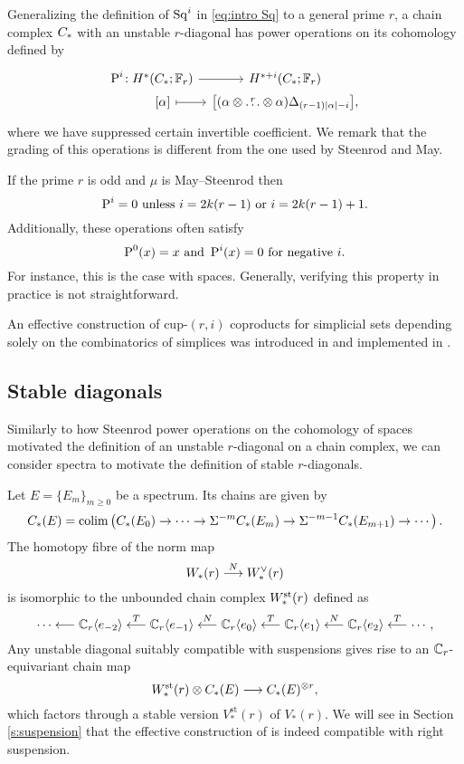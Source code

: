 Generalizing the definition of $\operatorname{Sq}^i$ in \cref{eq:intro Sq} to a general prime $r$, a chain complex $C_{*}$ with an unstable $r$-diagonal has power operations on its cohomology defined by
\begin{equation}\label{eq:intro P}
	\begin{tikzcd}[column sep=tiny, row sep=0]
		\power^i \colon &[-15pt] H^*(\ucadenas;\bF_r) \arrow[r] & H^{*+i}(\ucadenas;\bF_r) \\
		& {[\alpha]} \arrow[r, mapsto] & \big{[}(\alpha \ot \overset{r}{\dots} \ot \alpha)\Delta_{(r-1)\bars{\alpha}-i}\big{]},
	\end{tikzcd}
\end{equation}
where we have suppressed certain invertible coefficient.
We remark that the grading of this operations is different from the one used by Steenrod and May.

If the prime $r$ is odd and $\mu$ is May--Steenrod then
\[
\operatorname{P}^i = 0 \text{ unless } i = 2k(r-1) \text{ or }i = 2k(r-1)+1.
\]
Additionally, these operations often satisfy
\[
\operatorname{P}^0(x) = x \text{ and }\operatorname{P}^i(x) = 0 \text{ for negative } i.
\]
For instance, this is the case with spaces.
Generally, verifying this property in practice is not straightforward.

An effective construction of cup-$(r,i)$ coproducts for simplicial sets depending solely on the combinatorics of simplices was introduced in \cite{medina2021may_st} and implemented in \cite{medina2021comch}.

\subsection{Stable diagonals}

Similarly to how Steenrod power operations on the cohomology of spaces motivated the definition of an unstable $r$-diagonal on a chain complex, we can consider spectra to motivate the definition of stable $r$-diagonals.

Let $E = \{E_m\}_{m \geq 0}$ be a spectrum. Its chains are given by
\[
C_{*}(E) = \operatorname*{colim} \left(C_{*}(E_0) \to \dots \to \Sigma^{-m}C_{*}(E_m) \to \Sigma^{-m-1} C_{*}(E_{m+1}) \to \dotsb\right).
\]
The homotopy fibre of the norm map
\[
W_{*}(r) \overset{N}{\longrightarrow} W^\vee_{*}(r)
\]
is isomorphic to the unbounded chain complex $W^{\mathrm{st}}_{*}(r)$ defined as
\[
\dotsb \longleftarrow \mathbb{C}_r\langle e_{-2}\rangle 
\overset{T}{\longleftarrow}
\mathbb{C}_r\langle e_{-1}\rangle 
\overset{N}{\longleftarrow}
\mathbb{C}_r\langle e_0\rangle 
\overset{T}{\longleftarrow}
\mathbb{C}_r\langle e_{1}\rangle 
\overset{N}{\longleftarrow}
\mathbb{C}_r\langle e_{2}\rangle 
\overset{T}{\longleftarrow}
\dotsb,
\]
Any unstable diagonal suitably compatible with suspensions gives rise to an $\mathbb{C}_r$-equivariant chain map
\[
W^{\mathrm{st}}_{*}(r) \otimes C_{*}(E) \longrightarrow C_{*}(E)^{\otimes r},
\]
which factors through a stable version $V_*^\mathrm{st}(r)$ of $V_*(r)$. We will see in Section \ref{s:suspension} that the effective construction of \cite{medina2021may_st} is indeed compatible with right suspension.

